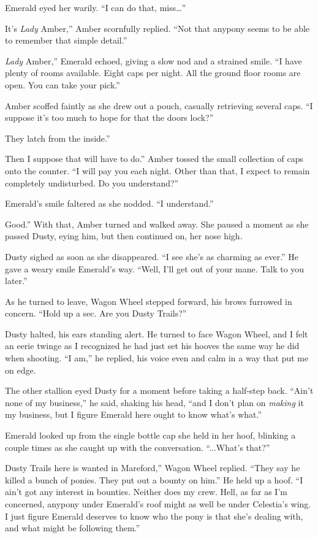 Emerald eyed her warily. “I can do that, miss…”

\leavevmode{}It’s \textit{Lady} Amber,” Amber scornfully replied. “Not that anypony seems to be able to remember that simple detail.”

\leavevmode{}\textit{Lady} Amber,” Emerald echoed, giving a slow nod and a strained smile. “I have plenty of rooms available. Eight caps per night. All the ground floor rooms are open. You can take your pick.”

Amber scoffed faintly as she drew out a pouch, casually retrieving several caps. “I suppose it’s too much to hope for that the doors lock?”

\leavevmode{}They latch from the inside.”

\leavevmode{}Then I suppose that will have to do.” Amber tossed the small collection of caps onto the counter. “I will pay you each night. Other than that, I expect to remain completely undisturbed. Do you understand?”

Emerald’s smile faltered as she nodded. “I understand.”

\leavevmode{}Good.” With that, Amber turned and walked away. She paused a moment as she passed Dusty, eying him, but then continued on, her nose high.

Dusty sighed as soon as she disappeared. “I see she’s as charming as ever.” He gave a weary smile Emerald’s way. “Well, I’ll get out of your mane. Talk to you later.”

As he turned to leave, Wagon Wheel stepped forward, his brows furrowed in concern. “Hold up a sec. Are you Dusty Trails?”

Dusty halted, his ears standing alert. He turned to face Wagon Wheel, and I felt an eerie twinge as I recognized he had just set his hooves the same way he did when shooting. “I am,” he replied, his voice even and calm in a way that put me on edge.

The other stallion eyed Dusty for a moment before taking a half-step back. “Ain’t none of my business,” he said, shaking his head, “and I don’t plan on \textit{making} it my business, but I figure Emerald here ought to know what’s what.”

Emerald looked up from the single bottle cap she held in her hoof, blinking a couple times as she caught up with the conversation. “...What’s that?”

\leavevmode{}Dusty Trails here is wanted in Mareford,” Wagon Wheel replied. “They say he killed a bunch of ponies. They put out a bounty on him.” He held up a hoof. “I ain’t got any interest in bounties. Neither does my crew. Hell, as far as I’m concerned, anypony under Emerald’s roof might as well be under Celestia’s wing. I just figure Emerald deserves to know who the pony is that she’s dealing with, and what might be following them.”

